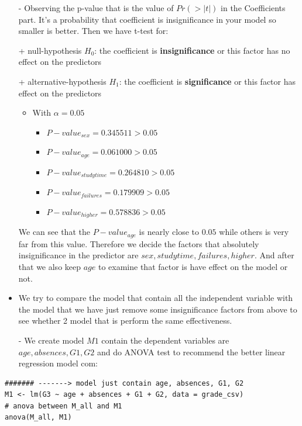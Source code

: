 \documentclass[a4paper]{article}
\numberwithin{equation}{section}
\begin{document}
\begin{itemize}
  \item[-] Observing the p-value that is the value of \(Pr(>|t|)\) in the Coefficients part. It's a probability that coefficient is insignificance in your model so smaller is better. Then we have t-test for:
\end{itemize}
\begin{itemize}
  \item[+] null-hypothesis $H_{0}$: the coefficient is \textbf{insignificance} or this factor has no effect on the predictors
  \item[+] alternative-hypothesis $H_{1}$: the coefficient is \textbf{significance} or this factor has effect on the predictors
        \begin{itemize}
          \item With \(\alpha = 0.05\)
                \begin{itemize}
                  \item \(P-value_{sex} = 0.345511 > 0.05\)
                  \item \(P-value_{age} = 0.061000 > 0.05\)
                  \item \(P-value_{studytime} = 0.264810 > 0.05\)
                  \item \(P-value_{failures} = 0.179909 > 0.05\)
                  \item \(P-value_{higher} = 0.578836 > 0.05\)
                \end{itemize}
        \end{itemize}

        We can see that the \(P-value_{age}\) is nearly close to \(0.05\) while others is very far from this value. Therefore we decide the factors that absolutely insignificance in the predictor are \(sex, studytime, failures, higher.\) And after that we also keep \(age\) to examine that factor is have effect on the model or not.
\end{itemize}

\begin{itemize}
  \item We try to compare the model that contain all the independent variable with the model that we have just remove some insignificance factors from above to see whether 2 model that is perform the same effectiveness.
\end{itemize}
\begin{itemize}
  \item[-] We create model \(M1\) contain the dependent variables are \(age, absences, G1, G2\) and do ANOVA test to recommend the better linear regression model com:
\end{itemize}
\begin{mdframed}[leftline=false,rightline=false,backgroundcolor=magenta!10,nobreak=true]
  \begin{verbatim}
####### -------> model just contain age, absences, G1, G2
M1 <- lm(G3 ~ age + absences + G1 + G2, data = grade_csv)
# anova between M_all and M1
anova(M_all, M1)
  \end{verbatim}
\end{mdframed}
\end{document}
